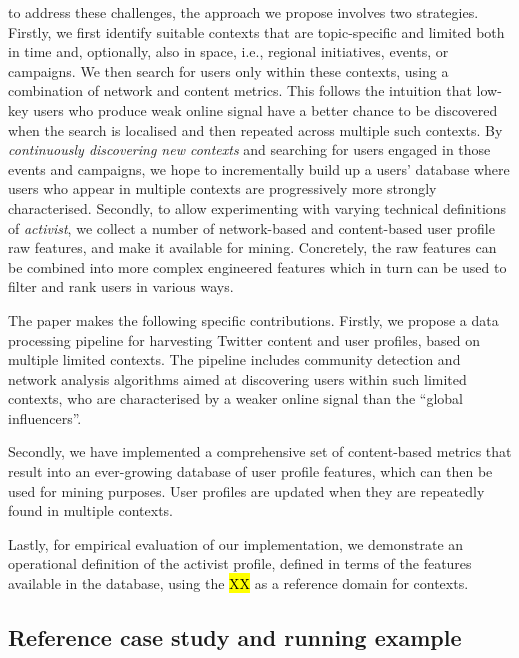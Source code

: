 \documentclass[runningheads]{llncs}
\begin{document}
to address these challenges, the approach we propose involves two strategies. 
Firstly, we first identify suitable contexts that are topic-specific and limited both in time and, optionally, also in space, i.e., regional initiatives, events, or campaigns.
We then search for users only within these contexts, using a combination of network and content metrics. 
This follows the intuition that low-key users who produce weak online signal have a better chance to be discovered when the search is localised and then repeated across multiple such contexts.
By \textit{continuously discovering new contexts} and searching for users engaged in those events and campaigns, we hope to incrementally build up a users' database where users who appear in multiple contexts are progressively more strongly characterised.
%
Secondly, to allow experimenting with varying technical definitions of \textit{activist}, we collect a number of network-based and content-based  user profile raw features, and make it available for mining. Concretely, the raw features can be combined into more complex engineered features which in turn can be used to filter and rank users in various ways.

The paper makes the following specific contributions.
%
Firstly, we propose a data processing pipeline for harvesting Twitter content and user profiles, based on multiple limited contexts. 
The pipeline includes community detection and network analysis algorithms aimed at discovering users within such limited contexts, who are characterised by a weaker online signal than the ``global influencers''.

Secondly, we have implemented a comprehensive set of content-based metrics that result into an ever-growing database of user profile features, which can then be used for mining purposes. 
User profiles are updated when they are repeatedly found in multiple contexts.

Lastly, for empirical evaluation of our implementation, we demonstrate an operational definition of the activist profile, defined in terms of the features available in the database, using the \hl{XX} as a reference domain for contexts. 


\subsection{Reference case study and running example}  \label{sec:reference}
\end{document}
